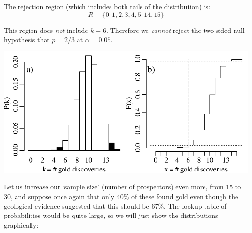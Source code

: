 The rejection region (which includes both tails of the distribution)
is:
\begin{equation}
  R=\{0,1,2,3,4,5,14,15\}
  \label{eq:2sidedbinomtest15}
\end{equation}

This region does \emph{not} include $k=6$. Therefore we \emph{cannot}
reject the two-sided null hypothesis that $p=2/3$ at
$\alpha=0.05$.\medskip

\noindent\begin{minipage}[t][][b]{.6\textwidth}
\includegraphics[]{../figures/2sidedbinomialrejection15.pdf}
\medskip
\end{minipage}
\begin{minipage}[t][][t]{.4\textwidth}
  \label{fig:2sidedbinomialrejection15}
\end{minipage}

Let us increase our `sample size' (number of prospectors) even more,
from 15 to 30, and suppose once again that only 40\% of these found
gold even though the geological evidence suggested that this should be
67\%. The lookup table of probabilities would be quite large, so we
will just show the distributions graphically:\medskip

